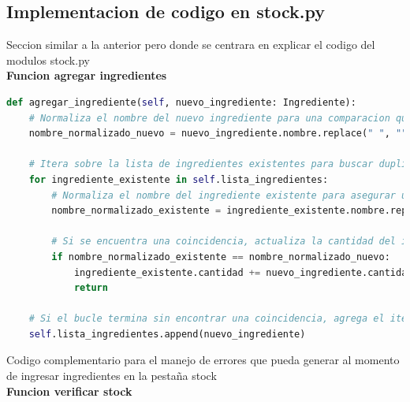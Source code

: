 \documentclass[a4paper,12pt]{article}
\begin{document}
\subsection{Implementacion de codigo en stock.py}
Seccion similar a la anterior pero donde se centrara en explicar el codigo del modulos stock.py\\
\textbf{Funcion agregar ingredientes}\\
\newpage
\begin{lstlisting}[language=Python, caption={Cambio de codigo}, frame=single]
def agregar_ingrediente(self, nuevo_ingrediente: Ingrediente):
    # Normaliza el nombre del nuevo ingrediente para una comparacion que no distinga mayusculas ni espacios.
    nombre_normalizado_nuevo = nuevo_ingrediente.nombre.replace(" ", "").lower()

    # Itera sobre la lista de ingredientes existentes para buscar duplicados.
    for ingrediente_existente in self.lista_ingredientes:
        # Normaliza el nombre del ingrediente existente para asegurar una comparacin justa.
        nombre_normalizado_existente = ingrediente_existente.nombre.replace(" ", "").lower()

        # Si se encuentra una coincidencia, actualiza la cantidad del ingrediente existente.
        if nombre_normalizado_existente == nombre_normalizado_nuevo:
            ingrediente_existente.cantidad += nuevo_ingrediente.cantidad
            return

    # Si el bucle termina sin encontrar una coincidencia, agrega el item como un ingrediente nuevo.
    self.lista_ingredientes.append(nuevo_ingrediente)
\end{lstlisting}
Codigo complementario para el manejo de errores que pueda generar al momento de ingresar ingredientes en la pestaña stock\\
\newpage
\textbf{Funcion verificar stock}
\end{document}

